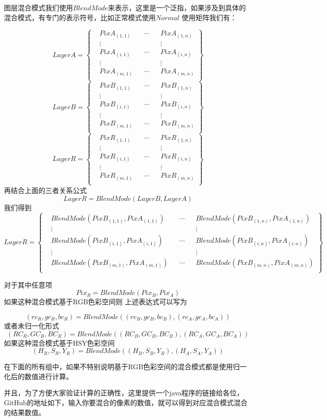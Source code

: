 图层混合模式我们使用$BlendMode$来表示，这里是一个泛指，如果涉及到具体的混合模式，有专门的表示符号，比如正常模式使用$Normal$
使用矩阵我们有：

$$LayerA=\left\{ \begin{aligned}     &PixA_{(1,1)}&&\cdots&&PixA_{(1,n)}\\&\vdots && &&\vdots\\  &PixA_{(i,1)} &&\cdots&&PixA_{(i,n)}\\&\vdots && &&\vdots\\  &PixA_{(m,1)} &&\cdots&&PixA_{(m,n)}\\  \end{aligned}\right\}$$
$$LayerB=\left\{ \begin{aligned}     &PixB_{(1,1)}&&\cdots&&PixB_{(1,n)}\\&\vdots && &&\vdots\\  &PixB_{(i,1)} &&\cdots&&PixB_{(i,n)}\\&\vdots && &&\vdots\\  &PixB_{(m,1)} &&\cdots&&PixB_{(m,n)}\\ \end{aligned}\right\}$$
$$LayerR=\left\{ \begin{aligned}     &PixR_{(1,1)}&&\cdots&&PixR_{(1,n)}\\&\vdots && &&\vdots\\  &PixR_{(i,1)} &&\cdots&&PixR_{(i,n)}\\&\vdots && &&\vdots\\  &PixR_{(m,1)} &&\cdots&&PixR_{(m,n)}\\ \end{aligned}\right\}$$
再结合上面的三者关系公式$$LayerR=BlendMode(LayerB,LayerA)$$
我们得到
$$LayerR=\left\{ \begin{aligned}   &BlendMode(PixB_{(1,1)},PixA_{(1,1)})&&\cdots&&BlendMode(PixB_{(1,n)},PixA_{(1,n)})\\&\vdots && &&\vdots\\&BlendMode(PixB_{(i,1)},PixA_{(i,1)})&&\cdots&&BlendMode(PixB_{(i,n)},PixA_{(i,n)})\\&\vdots && &&\vdots\\&BlendMode(PixB_{(m,1)},PixA_{(m,1)})&&\cdots&&BlendMode(PixB_{(m,n)},PixA_{(m,n)})\\\end{aligned}\right\}$$

对于其中任意项
$$Pix_R=BlendMode(Pix_B,Pix_A)$$
如果这种混合模式基于RGB色彩空间则
上述表达式可以写为

$$(rc_{R},gc_{R},bc_{R})=BlendMode((rc_{B},gc_{B},bc_{B}),(rc_{A},gc_{A},bc_{A}))$$
或者未归一化形式
$$(RC_{R},GC_{R},BC_{R})=BlendMode((RC_{B}, GC_{B}, BC_{B}),(RC_{A}, GC_{A}, BC_{A}))$$
如果这种混合模式基于HSY色彩空间
$$(H_{R},S_{R},Y_{R})=BlendMode((H_{B},S_{B},Y_{B}),(H_{A},S_{A},Y_{A}))$$

在下面的所有组中，如果不特别说明基于RGB色彩空间的混合模式都是使用归一化后的数值进行计算。

并且，为了方便大家验证计算的正确性，这里提供一个java程序的链接给各位，GitHub的地址如下，输入你要混合的像素的数值，就可以得到对应混合模式混合的结果数值。
